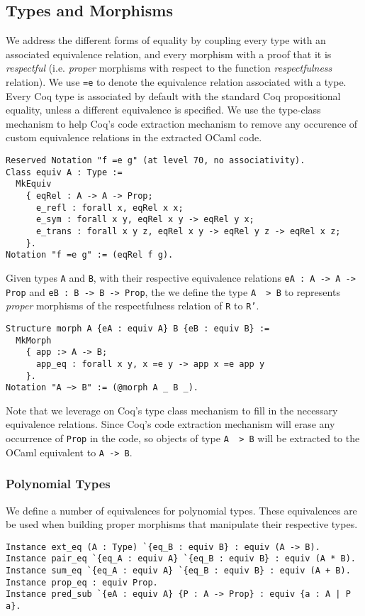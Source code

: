\documentclass[a4paper, UKenglish, cleveref, autoref, thm-restate]{lipics-v2021}
\begin{document}
\subsection{Types and Morphisms}
\label{sec:types-morphisms}
We address the different forms of equality by coupling every type with an
associated equivalence relation, and every morphism with a proof that it is
\emph{respectful} (i.e. \emph{proper} morphisms with respect to the function
\emph{respectfulness} relation). We use \texttt{=e} to denote the
equivalence relation associated with a type. Every Coq type is associated by
default with the standard Coq propositional equality, unless a different
equivalence is specified. We use the type-class mechanism to help Coq's code
extraction mechanism to remove any occurence of custom equivalence relations
in the extracted OCaml code.
\begin{verbatim}
Reserved Notation "f =e g" (at level 70, no associativity).
Class equiv A : Type :=
  MkEquiv
    { eqRel : A -> A -> Prop;
      e_refl : forall x, eqRel x x;
      e_sym : forall x y, eqRel x y -> eqRel y x;
      e_trans : forall x y z, eqRel x y -> eqRel y z -> eqRel x z;
    }.
Notation "f =e g" := (eqRel f g).
\end{verbatim}
Given types \texttt{A} and  \texttt{B}, with their respective
equivalence relations \texttt{eA : A -> A -> Prop} and
\texttt{eB : B -> B -> Prop}, the we define the type
\texttt{A ~> B} to represents \emph{proper} morphisms of the
respectfulness relation of \texttt{R} to \texttt{R'}.
\begin{verbatim}
Structure morph A {eA : equiv A} B {eB : equiv B} :=
  MkMorph
    { app :> A -> B;
      app_eq : forall x y, x =e y -> app x =e app y
    }.
Notation "A ~> B" := (@morph A _ B _).
\end{verbatim}
Note that we leverage on Coq's type class mechanism to fill in the necessary
equivalence relations. Since Coq's code extraction mechanism will erase any
occurrence of \texttt{Prop} in the code, so objects of type
\texttt{A ~> B} will be extracted to the OCaml equivalent to
\texttt{A -> B}.

\subsubsection{Polynomial Types}
We define a number of equivalences for polynomial types. These equivalences are
be used when building proper morphisms that manipulate their respective types.
\begin{verbatim}
Instance ext_eq (A : Type) `{eq_B : equiv B} : equiv (A -> B).
Instance pair_eq `{eq_A : equiv A} `{eq_B : equiv B} : equiv (A * B).
Instance sum_eq `{eq_A : equiv A} `{eq_B : equiv B} : equiv (A + B).
Instance prop_eq : equiv Prop.
Instance pred_sub `{eA : equiv A} {P : A -> Prop} : equiv {a : A | P a}.
\end{verbatim}
\end{document}
